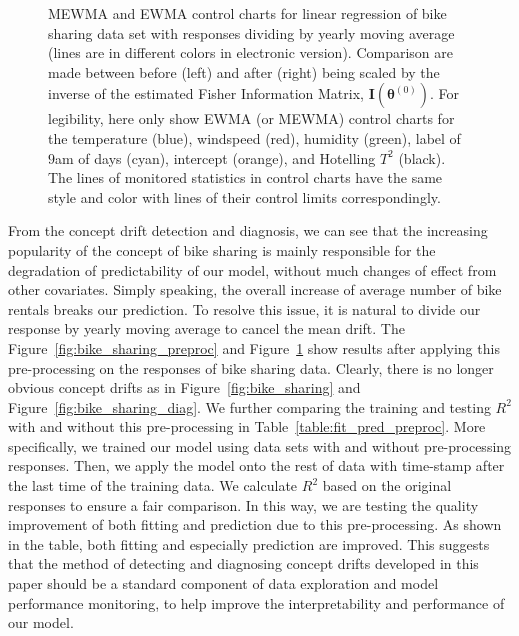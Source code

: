 \documentclass[twoside,11pt]{article}
\begin{document}
\begin{figure}[!htbp]
  \caption{
  MEWMA and EWMA control charts for linear regression of bike sharing data set with responses dividing by yearly moving average (lines are in different colors in electronic version). Comparison are made between before (left) and after (right) being scaled by the inverse of the estimated Fisher Information Matrix, $\mathbf {I} ( {\bm{\theta}} ^{(0)})$. For legibility, here only show EWMA (or MEWMA) control charts for the temperature (blue), windspeed (red), humidity (green), label of $9$am of days (cyan), intercept (orange), and Hotelling $T^2$ (black). The lines of monitored statistics in control charts have the same style and color with lines of their control limits correspondingly.
}
\label{fig:bike_sharing_preproc_diag}
\end{figure}

From the concept drift detection and diagnosis, we can see that the increasing popularity of the concept of bike sharing is mainly responsible for the degradation of predictability of our model, without much changes of effect from other covariates. Simply speaking, the overall increase of average number of bike rentals breaks our prediction. To resolve this issue, it is natural to divide our response by yearly moving average to cancel the mean drift. The Figure~\ref{fig:bike_sharing_preproc} and Figure~\ref{fig:bike_sharing_preproc_diag} show results after applying this pre-processing on the responses of bike sharing data. Clearly, there is no longer obvious concept drifts as in Figure~\ref{fig:bike_sharing} and Figure~\ref{fig:bike_sharing_diag}. We further comparing the training and testing $R^2$ with and without this pre-processing in Table~\ref{table:fit_pred_preproc}. More specifically, we trained our model using data sets with and without pre-processing responses. Then, we apply the model onto the rest of data with time-stamp after the last time of the training data. We calculate $R^2$ based on the original responses to ensure a fair comparison. In this way, we are testing the quality improvement of both fitting and prediction due to this pre-processing. As shown in the table, both fitting and especially prediction are improved. This suggests that the method of detecting and diagnosing concept drifts developed in this paper should be a standard component of data exploration and model performance monitoring, to help improve the interpretability and performance of our model.
\end{document}
